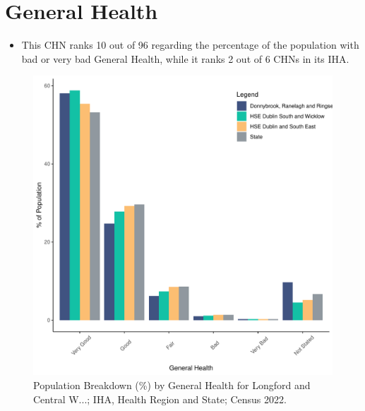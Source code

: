 \documentclass{article}
\begin{document}
\pagebreak

\section{General Health}\label{sect:GenHealth}
\begin{itemize}
\item  This CHN ranks  10 out of 96 regarding the percentage of the population with bad or very bad General Health, while it ranks   2 out of 6 CHNs in its IHA.
\end{itemize}
\begin{figure}[h]
	\centering
	\includegraphics[width = 150mm]{../figures/GenED.pdf}
	\caption{Population Breakdown (\%) by General Health for Longford and Central W...; IHA, Health Region and State;  Census 2022.}
	\label{fig:2ae19629-1a6a-13a3-e055-000000000001}
	\end{figure}
\end{document}
